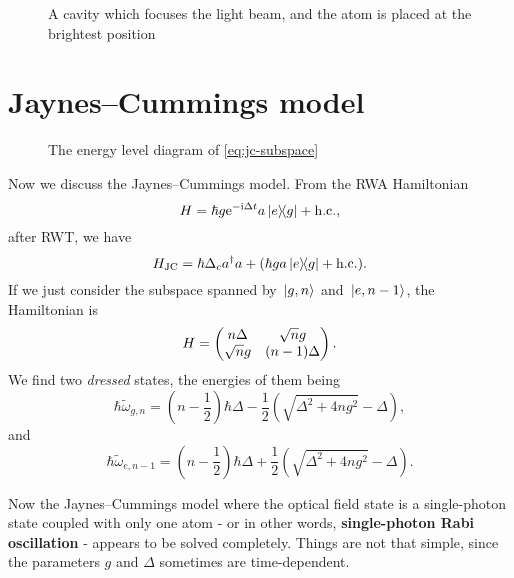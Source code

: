 \documentclass[hyperref, a4paper]{article}
\newcommand*{\ii}{\mathrm{i}}
\newcommand*{\ee}{\mathrm{e}}
\newcommand*{\concept}[1]{{\textbf{#1}}}
\begin{document}
\begin{figure}
    \centering
    
    \caption{A cavity which focuses the light beam, and the atom is placed at the brightest position}
    \label{fig:focus}
\end{figure}

\section{Jaynes–Cummings model} 

\begin{figure}
    \centering
    
    \caption{The energy level diagram of \eqref{eq:jc-subspace}}
    \label{fig:jc-subspace}
\end{figure}

Now we discuss the Jaynes–Cummings model. From the RWA Hamiltonian
\begin{equation}
    H = \hbar g \ee^{- \ii \Delta t} a \dyad{e}{g} + \text{h.c.},
\end{equation}
after RWT, we have  
\begin{equation}
    H_\text{JC} = \hbar \Delta_c a^\dagger a + (\hbar g a \dyad{e}{g} + \text{h.c.}). 
\end{equation}
If we just consider the subspace spanned by $\ket*{g, n}$ and $\ket*{e, n-1}$, the Hamiltonian is 
\begin{equation}
    H = \pmqty{n \Delta & \sqrt{n} g \\ \sqrt{n} g & (n-1) \Delta}.
    \label{eq:jc-subspace}
\end{equation}
We find two \emph{dressed} states, the energies of them being 
\begin{equation}
    \hbar \tilde{\omega}_{g,n} = \left(n - \frac{1}{2}\right) \hbar \Delta - \frac{1}{2} (\sqrt{\Delta^2 + 4 n g^2} - \Delta), 
\end{equation}
and 
\begin{equation}
    \hbar \tilde{\omega}_{e, n-1} = \left(n - \frac{1}{2}\right) \hbar \Delta + \frac{1}{2} (\sqrt{\Delta^2 + 4 n g^2} - \Delta).
\end{equation}

Now the Jaynes–Cummings model where the optical field state is a single-photon state coupled with only 
one atom - or in other words, \concept{single-photon Rabi oscillation} - appears to be solved completely. 
Things are not that simple, since the parameters $g$ and $\Delta$ sometimes are time-dependent. 
\end{document}

